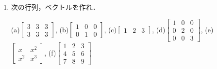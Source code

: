 \begin{enumerate}
\item 次の行列，ベクトルを作れ．

(a)$\displaystyle  \left[ \begin {array}{ccc} 3&3&3\\ 3&3&3\end {array} \right] $,
(b)$\displaystyle  \left[ \begin {array}{ccc} 1&0&0\\ 0&1&0\end {array} \right] $,
(c)$\displaystyle  \left[ \begin {array}{ccc} 1&2&3\end {array} \right] $,
(d)$\displaystyle  \left[ \begin {array}{ccc} 1&0&0\\ 0&2&0\\ 0&0&3\end {array} \right] $,
(e)$\displaystyle  \left[ \begin {array}{cc} x&{x}^{2}\\ {x}^{2}&{x}^{3}\end {array} \right] $,
(f)$\displaystyle  \left[ \begin {array}{ccc} 1&2&3\\ 4&5&6\\ 7&8&9\end {array} \right] $
\end{enumerate}

